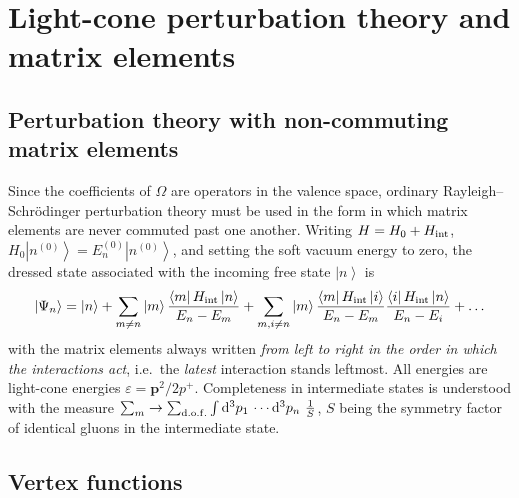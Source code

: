 \documentclass[11pt]{article}
\newcommand{\eps}{\varepsilon}
\newcommand{\dd}{\mathrm{d}}
\newcommand{\dt}[1]{\dd^3 #1\,}
\newcommand{\ket}[1]{\left|#1\right\rangle}
\newcommand{\me}[3]{\left\langle #1 \right| #2 \left| #3 \right\rangle}
\newcommand{\OM}{\Omega}
\begin{document}
\section{Light-cone perturbation theory and matrix elements}
\label{sec:lcpt}

\subsection{Perturbation theory with non-commuting matrix elements}

Since the coefficients of $\OM$ are operators in the valence space, ordinary Rayleigh--Schr\"odinger
perturbation theory must be used in the form in which matrix elements are never commuted past one
another. Writing $H=H_0+H_{\rm int}$, $H_0\ket{n^{(0)}}=E^{(0)}_n\ket{n^{(0)}}$, and setting the
soft vacuum energy to zero, the dressed state associated with the incoming free state $\ket{n}$ is
\begin{equation}
\ket{\Psi_n}=\ket{n}
+\sum_{m\neq n}\ket{m}\frac{\me{m}{H_{\rm int}}{n}}{E_n-E_m}
+\sum_{m,i\neq n}\ket{m}\frac{\me{m}{H_{\rm int}}{i}}{E_n-E_m}\frac{\me{i}{H_{\rm int}}{n}}{E_n-E_i}
+\dots
\label{eq:PT}
\end{equation}
with the matrix elements always written {\em from left to right in the order in which the
interactions act}, i.e.\ the {\em latest} interaction stands leftmost. All energies are light-cone
energies $\eps=\bm p^2/2p^+$. Completeness in intermediate states is understood with the measure
$\sum_m\to\sum_{\rm d.o.f.}\int \dt{p_1}\cdots\dt{p_n}\,\frac{1}{S}$, $S$ being the symmetry factor
of identical gluons in the intermediate state.

\subsection{Vertex functions}
\end{document}
